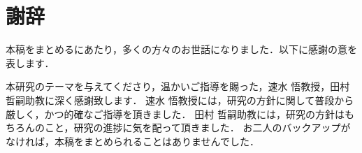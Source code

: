\chapter*{謝辞}
本稿をまとめるにあたり，多くの方々のお世話になりました．以下に感謝の意を表します．

本研究のテーマを与えてくださり，温かいご指導を賜った，速水 悟教授，田村 哲嗣助教に深く感謝致します．
速水 悟教授には，研究の方針に関して普段から厳しく，かつ的確なご指導を頂きました．
田村 哲嗣助教には，研究の方針はもちろんのこと，研究の進捗に気を配って頂きました．
お二人のバックアップがなければ，本稿をまとめられることはありませんでした．





